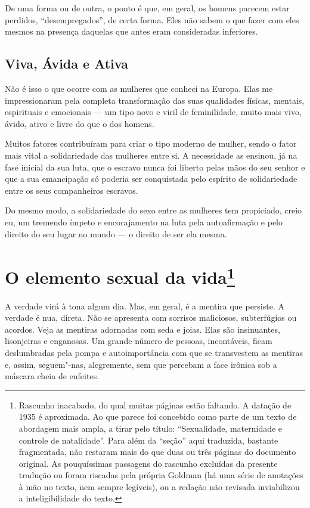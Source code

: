 De uma forma ou de outra, o ponto é que, em geral, os homens parecem
estar perdidos, ``desempregados'', de certa forma. Eles não sabem o que
fazer com eles mesmos na presença daquelas que antes eram consideradas
inferiores.

\section{Viva, Ávida e Ativa}

Não é isso o que ocorre com as mulheres que conheci na Europa. Elas me
impressionaram pela completa transformação das suas qualidades físicas,
mentais, espirituais e emocionais --- um tipo novo e viril de
feminilidade, muito mais vivo, ávido, ativo e livre do que o dos homens.

Muitos fatores contribuíram para criar o tipo moderno de mulher, sendo o
fator mais vital a solidariedade das mulheres entre si. A necessidade as
ensinou, já na fase inicial da sua luta, que o escravo nunca foi liberto
pelas mãos do seu senhor e que a sua emancipação só poderia ser
conquistada pelo espírito de solidariedade entre os seus companheiros
escravos.

Do mesmo modo, a solidariedade do sexo entre as mulheres tem propiciado,
creio eu, um tremendo ímpeto e encorajamento na luta pela autoafirmação
e pelo direito do seu lugar no mundo --- o direito de ser ela mesma.

\chapter{O elemento sexual da vida\footnote{Rascunho inacabado, do qual muitas
  páginas estão faltando. A datação de 1935 é aproximada. Ao que parece foi
  concebido como parte de um texto de abordagem mais ampla, a tirar pelo
  título: ``Sexualidade, maternidade e controle de natalidade''. Para
  além da ``seção'' aqui traduzida, bastante fragmentada, não restaram
  mais do que duas ou três páginas do documento original. As
  pouquíssimas passagens do rascunho excluídas da presente tradução ou
  foram riscadas pela própria Goldman (há uma série de anotações à mão
  no texto, nem sempre legíveis), ou a redação não revisada inviabilizou
  a inteligibilidade do texto.}}


A verdade virá à tona algum dia. Mas, em geral, é a mentira que
persiste. A verdade é nua, direta. Não se apresenta com sorrisos
maliciosos, subterfúgios ou acordos. Veja as mentiras adornadas com seda
e joias. Elas são insinuantes, lisonjeiras e enganosas. Um grande número de pessoas,
incontáveis, ficam deslumbradas pela pompa e autoimportância com que se
transvestem as mentiras e, assim, seguem"-nas, alegremente, sem que percebam
a face irônica sob a máscara cheia de enfeites.

